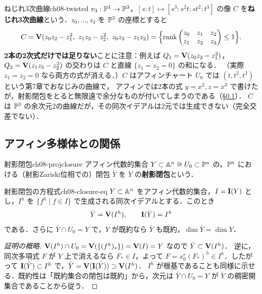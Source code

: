 \begin{myex}{ねじれ3次曲線}{ch08-twisted}
$v_3:\mathbb{P}^1\to\mathbb{P}^3$，$[s:t]\mapsto[s^3:s^2t:st^2:t^3]$ の像 $C$ を\textbf{ねじれ3次曲線}という．$z_0,\dots,z_3$ を $\mathbb{P}^3$ の座標とすると
\[
  C=\Zero(z_0z_2-z_1^2,\ z_1z_3-z_2^2,\ z_0z_3-z_1z_2)
  =\Bigl\{\rank\begin{pmatrix}z_0&z_1&z_2\\z_1&z_2&z_3\end{pmatrix}\le1\Bigr\}.
\]
\textbf{2本の2次式だけでは足りない}ことに注意：例えば $Q_1=\mathbf{V}(z_0z_2-z_1^2)$，$Q_2=\mathbf{V}(z_1z_3-z_2^2)$ の交わりは $C$ と直線 $\{z_1=z_2=0\}$ の和になる．
（実際 $z_1=z_2=0$ なら両方の式が消える．）$C$ はアフィンチャート $U_0$ では $(t,t^2,t^3)$ という第7章でおなじみの曲線で，
アフィンでは2本の式 $y=x^2,z=x^3$ で書けたが，射影閉包をとると無限遠で余分なものが付いてしまうのである（\S\ref{sec:ch08-closure}）．
$C$ は $\mathbb{P}^3$ の余次元2の曲線だが，その同次イデアルは2元では生成できない（完全交差でない）．
\end{myex}

\subsection{アフィン多様体との関係}
\label{sec:ch08-closure}

\begin{mydef}{射影閉包}{ch08-projclosure}
アフィン代数的集合 $Y\subset\mathbb{A}^n\cong U_0\subset\mathbb{P}^n$ の，$\mathbb{P}^n$ における（射影Zariski位相での）閉包 $\bar Y$ を $Y$ の\textbf{射影閉包}という．
\end{mydef}

\begin{mythm}{射影閉包の方程式}{ch08-closure-eq}
$Y\subset\mathbb{A}^n$ をアフィン代数的集合，$I=\mathbf{I}(Y)$ とし，$I^h$ を $\{f^h\mid f\in I\}$ で生成される同次イデアルとする．このとき
\[
  \bar Y=\mathbf{V}(I^h),\qquad \mathbf{I}(\bar Y)=I^h
\]
である．さらに $\bar Y\cap U_0=Y$ で，$Y$ が既約なら $\bar Y$ も既約，$\dim\bar Y=\dim Y$．
\end{mythm}

\begin{proof}[証明の概略]
$\mathbf{V}(I^h)\cap U_0=\mathbf{V}(\{(f^h)_*\})=\mathbf{V}(I)=Y$ なので $\bar Y\subset\mathbf{V}(I^h)$．
逆に，同次多項式 $F$ が $Y$ 上で消えるなら $F_*\in I$，よって $F=x_0^e(F_*)^h\in I^h$．したがって $\mathbf{I}(\bar Y)\subset I^h$ で，$\bar Y=\mathbf{V}(\mathbf{I}(\bar Y))\supset\mathbf{V}(I^h)$．
$I^h$ が根基であることも同様に示せる．既約性は「既約集合の閉包は既約」から，次元は $\bar Y\cap U_0=Y$ が $\bar Y$ の稠密開集合であることから従う．
\end{proof}

